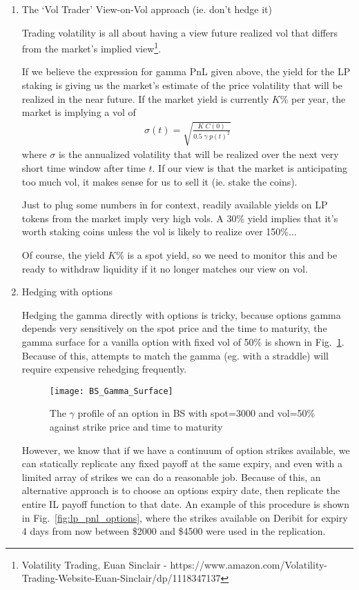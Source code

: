 \documentclass{article}
\begin{document}
\begin{enumerate}

\item The `Vol Trader' View-on-Vol approach (ie. don't hedge it)

Trading volatility is all about having a view future realized vol that differs from the market's implied view\footnote{Volatility Trading, Euan Sinclair - https://www.amazon.com/Volatility-Trading-Website-Euan-Sinclair/dp/1118347137}.

If we believe the expression for gamma PnL given above, the yield for the LP staking is giving us the market's estimate of the price volatility that will be realized in the near future. If the market yield is currently $K$\% per year, the market is implying a vol of
\begin{align}
\sigma(t) = \sqrt{{\frac {K\; C(0)} {0.5 \; \gamma \; p(t)^2} }}
\label{eqn:implied_vol}
\end{align}
where $\sigma$ is the annualized volatility that will be realized over the next very short time window after time $t$. If our view is that the market is anticipating too much vol, it makes sense for us to sell it (ie. stake the coins).

Just to plug some numbers in for context, readily available yields on LP tokens from the market imply very high vols. A 30\% yield implies that it's worth staking coins unless the vol is likely to realize over 150\%...

Of course, the yield $K$\% is a spot yield, so we need to monitor this and be ready to withdraw liquidity if it no longer matches our view on vol.


\item Hedging with options

Hedging the gamma directly with options is tricky, because options gamma depends very sensitively on the spot price and the time to maturity, the gamma surface for a vanilla option with fixed vol of 50\% is shown in Fig.~\ref{fig:bs_gamma_surface}. Because of this, attempts to match the gamma (eg. with a straddle) will require expensive rehedging frequently.

\begin{figure}
\centering
\texttt{[image: BS\_Gamma\_Surface]}
\caption{The $\gamma$ profile of an option in BS with spot=3000 and vol=50\% against strike price and time to maturity}
\label{fig:bs_gamma_surface}
\end{figure}

However, we know that if we have a continuum of option strikes available, we can statically replicate any fixed payoff at the same expiry, and even with a limited array of strikes we can do a reasonable job. Because of this, an alternative approach is to choose an options expiry date, then replicate the entire IL payoff function to that date. An example of this procedure is shown in Fig.~\ref{fig:lp_pnl_options}, where the strikes available on Deribit for expiry 4 days from now between \$2000 and \$4500 were used in the replication.


\end{enumerate}
\end{document}
